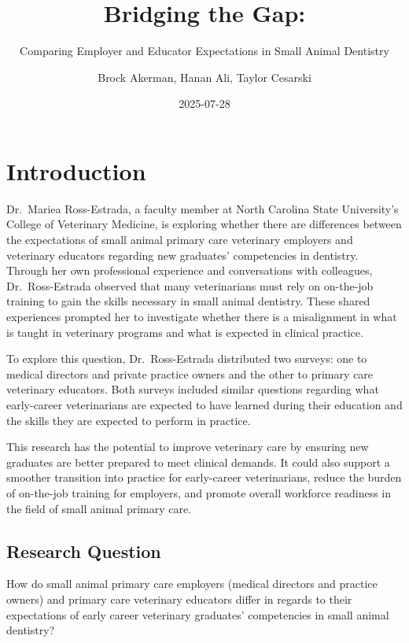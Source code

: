 \documentclass[
  12pt,
  letterpaper,
  DIV=11,
  numbers=noendperiod]{scrartcl}
\title{Bridging the Gap:}
\subtitle{Comparing Employer and Educator Expectations in Small Animal
Dentistry}
\author{Brock Akerman, Hanan Ali, Taylor Cesarski}
\date{2025-07-28}
\numberwithin{figure}{section}
\numberwithin{table}{section}
\renewcommand*\contentsname{Table of contents}
\newcommand\contentsname{Table of contents}
\begin{document}
\maketitle

\renewcommand*\contentsname{Table of contents}
{
\hypersetup{linkcolor=}
\setcounter{tocdepth}{2}
\tableofcontents
}

\newpage

\section{Introduction}\label{introduction}

Dr.~Mariea Ross-Estrada, a faculty member at North Carolina State
University's College of Veterinary Medicine, is exploring whether there
are differences between the expectations of small animal primary care
veterinary employers and veterinary educators regarding new graduates'
competencies in dentistry. Through her own professional experience and
conversations with colleagues, Dr.~Ross-Estrada observed that many
veterinarians must rely on on-the-job training to gain the skills
necessary in small animal dentistry. These shared experiences prompted
her to investigate whether there is a misalignment in what is taught in
veterinary programs and what is expected in clinical practice.

To explore this question, Dr.~Ross-Estrada distributed two surveys: one
to medical directors and private practice owners and the other to
primary care veterinary educators. Both surveys included similar
questions regarding what early-career veterinarians are expected to have
learned during their education and the skills they are expected to
perform in practice.

This research has the potential to improve veterinary care by ensuring
new graduates are better prepared to meet clinical demands. It could
also support a smoother transition into practice for early-career
veterinarians, reduce the burden of on-the-job training for employers,
and promote overall workforce readiness in the field of small animal
primary care.

\subsection{Research Question}\label{research-question}

How do small animal primary care employers (medical directors and
practice owners) and primary care veterinary educators differ in regards
to their expectations of early career veterinary graduates' competencies
in small animal dentistry?
\end{document}
